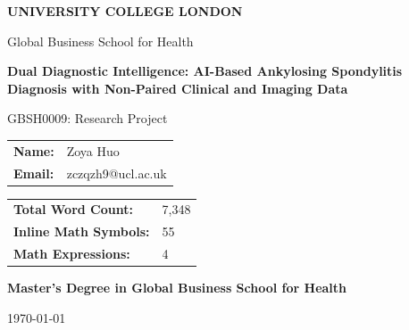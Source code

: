 \documentclass[12pt, a4paper]{article}
\let\Oldincludegraphics\includegraphics
\renewcommand{\includegraphics}[2][]{%
  \IfFileExists{#2}{\Oldincludegraphics[#1]{#2}}{\fbox{\texttt{\detokenize{#2}}}}}%
\begin{document}
\newpage

\begin{titlepage}
\begin{center}


\vspace{1cm}

{\Large \textbf{UNIVERSITY COLLEGE LONDON}}

\vspace{0.5cm}

{\large Global Business School for Health}

\vspace{1.5cm}

{\LARGE \textbf{Dual Diagnostic Intelligence: AI-Based Ankylosing Spondylitis Diagnosis with Non-Paired Clinical and Imaging Data}}

\vspace{2cm}

{\large GBSH0009: Research Project}

\vspace{1.5cm}

\begin{tabular}{ll}
\textbf{Name:} & Zoya Huo \\
\textbf{Email:} & zczqzh9@ucl.ac.uk \\
\end{tabular}

\vspace{1.5cm}

\begin{tabular}{ll}
\textbf{Total Word Count:} & 7,348 \\
\textbf{Inline Math Symbols:} & 55 \\
\textbf{Math Expressions:} & 4 \\
\end{tabular}

\vspace{1.5cm}


\vspace{0.5cm}

\vspace{0.5cm}
{\Large \textbf{Master's Degree in Global Business School for Health}}

\vspace{1cm}

{\large \today}

\end{center}
\end{titlepage}
\end{document}
